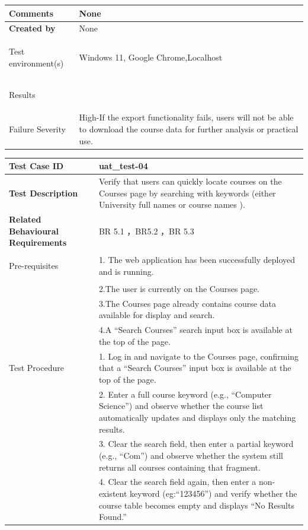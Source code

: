 \begin{table}[h]
\begin{tabularx}{\linewidth}{>{\bfseries}l X}
Comments & None \\ \hline

Created by & None \\ \hline

Test environment(s) & Windows 11, Google Chrome,Localhost\\ \hline

Results &  \\ \hline

Failure Severity& High-If the export functionality fails, users will not be able to download the course data for further analysis or practical use.\\ \hline
\end{tabularx}
\end{table}


\begin{table}[h]
\begin{tabularx}{\linewidth}{>{\bfseries}l X}
\hline
Test Case ID & uat\_test-04 \\ \hline

Test Description & Verify that users can quickly locate courses on the Courses page by searching with keywords (either University full names or  course names ).\\ \hline
Related Behavioural Requirements & BR 5.1 ，BR5.2 ，BR 5.3 \\ \hline

Pre-requisites & 1. The web application has been successfully deployed and is running.\\
& 2.The user is currently on the Courses page.\\
&3.The Courses page already contains course data available for display and search.\\
&4.A “Search Courses” search input box is available at the top of the page. \\ \hline

Test Procedure & 1. Log in and navigate to the Courses page, confirming that a “Search Courses” input box is available at the top of the page.\\
&2. Enter a full course keyword (e.g., “Computer Science”) and observe whether the course list automatically updates and displays only the matching results.\\
&3. Clear the search field, then enter a partial keyword (e.g., “Com”) and observe whether the system still returns all courses containing that fragment.\\
&4. Clear the search field again, then enter a non-existent keyword (eg:“123456”) and verify whether the course table becomes empty and displays “No Results Found.” \\ \hline


\end{tabularx}
\end{table}
